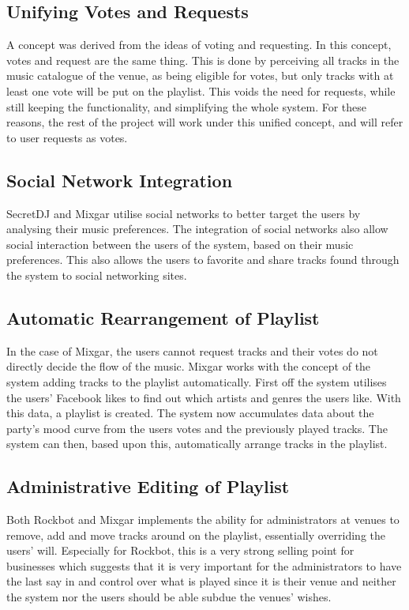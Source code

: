 \subsection{Unifying Votes and Requests}
A concept was derived from the ideas of voting and requesting. In this concept, votes and request are the same thing. This is done by perceiving all tracks in the music catalogue of the venue, as being eligible for votes, but only tracks with at least one vote will be put on the playlist. This voids the need for requests, while still keeping the functionality, and simplifying the whole system.
For these reasons, the rest of the project will work under this unified concept, and will refer to user requests as votes.

\subsection{Social Network Integration}
SecretDJ and Mixgar utilise social networks to better target the users by analysing their music preferences. The integration of social networks also allow social interaction between the users of the system, based on their music preferences. This also allows the users to favorite and share tracks found through the system to social networking sites.

\subsection{Automatic Rearrangement of Playlist}
\label{sub:auto_rearrange_playlist}
In the case of Mixgar, the users cannot request tracks and their votes do not directly decide the flow of the music. 
Mixgar works with the concept of the system adding tracks to the playlist automatically. First off the system utilises the users’ Facebook likes to find out which artists and genres the users like. With this data, a playlist is created. The system now accumulates data about the party’s mood curve from the users votes and the previously played tracks. The system can then, based upon this, automatically arrange tracks in the playlist.

\subsection{Administrative Editing of Playlist}
Both Rockbot and Mixgar implements the ability for administrators at venues to remove, add and move tracks around on the playlist, essentially overriding the users' will. Especially for Rockbot, this is a very strong selling point for businesses which suggests that it
is very important for the administrators to have the last say in and control over what is played since it is their venue and neither the system nor the users should be able subdue the venues' wishes.

